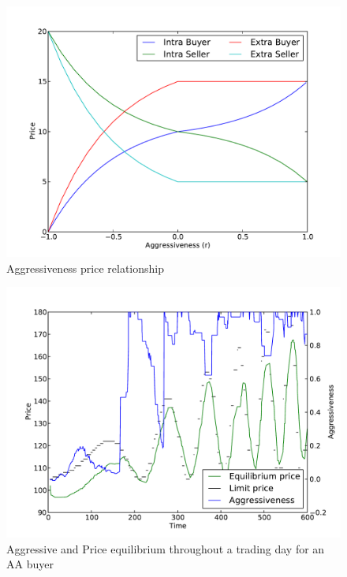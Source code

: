 \documentclass[preprint]{acm_proc_article-sp} %
\begin{document}
\begin{figure}[H]
\centering
\includegraphics[width=\columnwidth]{graphs_and_stats/graph_r.pdf}
\caption{Aggressiveness price relationship}
\label{fig:r_price}
\end{figure}

\begin{figure}[H] 
\centering
\includegraphics[width=\columnwidth]{graphs_and_stats/graph_aggressiveness_vs_price.pdf}
\caption{Aggressive and Price equilibrium throughout a trading day for an AA
buyer}
\label{fig:avtime}
\end{figure}
\end{document}
